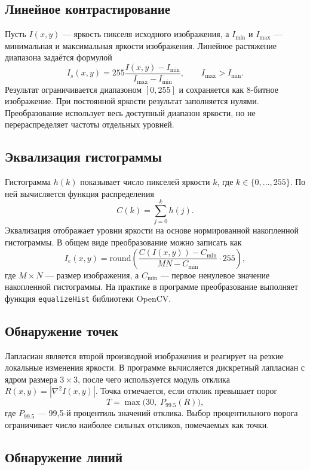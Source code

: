 \documentclass[12pt,a4paper]{article}
\begin{document}
\subsection{Линейное контрастирование}

Пусть $I(x,y)$ --- яркость пикселя исходного изображения, а $I_{\min}$ и
$I_{\max}$ --- минимальная и максимальная яркости изображения. Линейное
растяжение диапазона задаётся формулой
\[
    I_s(x,y) =
    255\frac{I(x,y)-I_{\min}}{I_{\max}-I_{\min}},
    \qquad I_{\max}>I_{\min}.
\]
Результат ограничивается диапазоном $[0,255]$ и сохраняется как 8-битное
изображение. При постоянной яркости результат заполняется нулями.
Преобразование использует весь доступный диапазон яркости, но не
перераспределяет частоты отдельных уровней.

\subsection{Эквализация гистограммы}

Гистограмма $h(k)$ показывает число пикселей яркости $k$, где
$k\in\{0,\ldots,255\}$. По ней вычисляется функция распределения
\[
    C(k)=\sum_{j=0}^{k}h(j).
\]
Эквализация отображает уровни яркости на основе нормированной накопленной
гистограммы. В общем виде преобразование можно записать как
\[
    I_e(x,y) =
    \mathrm{round}\left(
        \frac{C(I(x,y))-C_{\min}}{MN-C_{\min}}\cdot255
    \right),
\]
где $M\times N$ --- размер изображения, а $C_{\min}$ --- первое ненулевое
значение накопленной гистограммы. На практике в программе преобразование
выполняет функция \texttt{equalizeHist} библиотеки OpenCV.

\subsection{Обнаружение точек}

Лапласиан является второй производной изображения и реагирует на резкие
локальные изменения яркости. В программе вычисляется дискретный лапласиан
с ядром размера $3\times3$, после чего используется модуль отклика
$R(x,y)=|\nabla^2 I(x,y)|$. Точка отмечается, если отклик превышает порог
\[
    T=\max\bigl(30,\; P_{99.5}(R)\bigr),
\]
где $P_{99.5}$ --- 99,5-й процентиль значений отклика. Выбор процентильного
порога ограничивает число наиболее сильных откликов, помечаемых как точки.

\subsection{Обнаружение линий}
\end{document}
